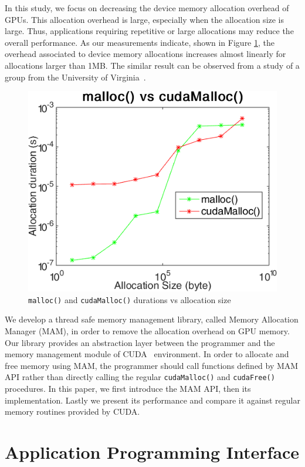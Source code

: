 \documentclass[conference]{IEEEtran}
\def\code#1{\texttt{#1}}
\begin{document}
In this study, we focus on decreasing the device memory allocation overhead of GPUs. This allocation overhead is large, especially when the allocation size is large. Thus, applications requiring repetitive or large allocations may reduce the overall performance. As our measurements indicate, shown in Figure \ref{fig:m-cm}, the overhead associated to device memory allocations increases almost linearly for allocations larger than 1MB.
The similar result can be observed from a study of a group from the University of Virginia~\cite{virginia}. 

\begin{figure}[h!]
\centering
  \includegraphics[width=0.8\linewidth]{malloc_vs_cuda-malloc.png}
  \caption{\code{malloc()} and \code{cudaMalloc()} durations vs allocation size}
  \label{fig:m-cm}
\end{figure}


We develop a thread safe memory management library, called Memory Allocation Manager (MAM), in order to remove the allocation overhead on GPU memory. Our library provides an abstraction layer between the programmer and the memory management module of CUDA~\cite{cuda} environment. In order to allocate and free memory using MAM, the programmer should call functions defined by MAM API rather than directly calling the regular \code{cudaMalloc()} and \code{cudaFree()} procedures. In this paper, we first introduce the MAM API, then its implementation. Lastly we present its performance and compare it against regular memory routines provided by CUDA. 


\section{Application Programming Interface}
\end{document}
